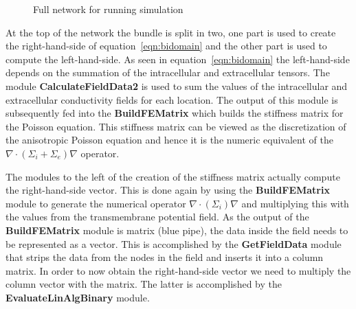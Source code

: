 \documentclass[fleqn,11pt,openany]{book}
\begin{document}
\begin{figure}
\caption{Full network for running simulation}\label{fig:SimulationNetwork}
\end{figure}

At the top of the network the bundle is split in two, one part is used to create the right-hand-side of equation~\ref{eqn:bidomain} and the other part is used to compute the left-hand-side. As seen in equation~\ref{eqn:bidomain}  the left-hand-side depends on the summation of the intracellular and extracellular tensors. The module {\bf CalculateFieldData2} is used to sum the values of the intracellular and extracellular conductivity fields for each location. The output of this module is subsequently fed into the {\bf BuildFEMatrix} which builds the stiffness matrix for the Poisson equation. This stiffness matrix can be viewed as the discretization of the anisotropic Poisson equation and hence it is the numeric equivalent of the $\nabla \cdot (\Sigma_i + \Sigma_e ) \nabla$  operator.

The modules to the left of the creation of the stiffness matrix actually compute the right-hand-side vector. This is done again by using the {\bf BuildFEMatrix} module to generate the numerical operator  $\nabla \cdot (\Sigma_i ) \nabla$ and multiplying this with the values from the transmembrane potential field. As the output of the  {\bf BuildFEMatrix} module is matrix (blue pipe), the data inside the field needs to be represented as a vector. This is accomplished by the {\bf GetFieldData} module that strips the data from the nodes in the field and inserts it into a column matrix. In order to now obtain the right-hand-side vector we need to multiply the column vector with the matrix. The latter is accomplished by the {\bf EvaluateLinAlgBinary} module. 
\end{document}

